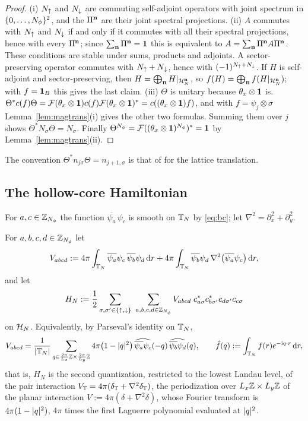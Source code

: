 \begin{proof}
(i) $N_{\uparrow}$ and $N_{\downarrow}$ are commuting self-adjoint operators with joint spectrum in $\{0,\dots,N_{\phi}\}^2$, and the
$\Pi^{\mathbf{n}}$ are their joint spectral projections. (ii) $A$ commutes with $N_{\uparrow}$ and $N_{\downarrow}$ if and only if it
commutes with all their spectral projections, hence with every $\Pi^{\mathbf{n}}$; since $\sum_{\mathbf{n}}\Pi^{\mathbf{n}}=\mathbf{1}$ this is
equivalent to $A=\sum_{\mathbf{n}}\Pi^{\mathbf{n}} A\Pi^{\mathbf{n}}$. These conditions are stable under sums, products and adjoints.
A sector-preserving operator commutes with $N_{\uparrow}+N_{\downarrow}$, hence with $(-1)^{N_{\uparrow}+N_{\downarrow}}$. If $H$ is self-adjoint and
sector-preserving, then $H=\bigoplus_{\mathbf{n}} H|_{\mathcal{H}_N^{\mathbf{n}}}$, so $f(H)=\bigoplus_{\mathbf{n}} f(H|_{\mathcal{H}_N^{\mathbf{n}}})$; with
$f=\mathbf{1}_B$ this gives the last claim. (iii) $\Theta$ is unitary because $\theta_x\otimes\mathbf{1}$ is.
$\Theta^*c(f)\Theta=\mathcal{F}(\theta_x\otimes\mathbf{1})c(f)\mathcal{F}(\theta_x\otimes\mathbf{1})^*=c((\theta_x\otimes\mathbf{1})f)$, and with
$f=\psi_j\otimes\sigma$ Lemma~\ref{lem:magtrans}(i) gives the other two formulas. Summing them over $j$ shows
$\Theta^*N_\sigma\Theta=N_\sigma$. Finally $\Theta^{N_{\phi}}=\mathcal{F}((\theta_x\otimes\mathbf{1})^{N_{\phi}})^*=\mathbf{1}$ by
Lemma~\ref{lem:magtrans}(ii).
\end{proof}

The convention $\Theta^*n_{j\sigma}\Theta=n_{j+1,\sigma}$ is that of \cite[Section~5.2]{BBDF21} for the lattice
translation.

\subsection{The hollow-core Hamiltonian}

For $a,c\in\mathbb{Z}_{N_{\phi}}$ the function $\overline{\psi_a}\,\psi_c$ is smooth on $\mathbb{T}_N$ by \eqref{eq:bc}; let
$\nabla^2=\partial_x^2+\partial_y^2$.

\begin{definition}\label{def:hamiltonian}
For $a,b,c,d\in\mathbb{Z}_{N_{\phi}}$ let
\begin{equation}\label{eq:Vabcd}
V_{abcd}:=4\pi\int_{\mathbb{T}_N}\overline{\psi_a}\psi_c\,\overline{\psi_b}\psi_d\,\mathrm{d} r+4\pi\int_{\mathbb{T}_N}\overline{\psi_b}\psi_d\,\nabla^2\bigl(\overline{\psi_a}\psi_c\bigr)\,\mathrm{d} r,
\end{equation}
and let
\begin{equation}\label{eq:HN}
H_N:=\frac12\sum_{\sigma,\sigma'\in\{\up,\dn\}}\ \sum_{a,b,c,d\in\Z_{\Nphi}}V_{abcd}\;
c_{a\sigma}^*c_{b\sigma'}^*c_{d\sigma'}c_{c\sigma}
\end{equation}
on $\mathcal{H}_N$. Equivalently, by Parseval's identity on $\mathbb{T}_N$,
\[
V_{abcd}=\frac1{\lvert\mathbb{T}_N\rvert}\sum_{q\in\frac{2\pi}{L_x}\mathbb{Z}\times\frac{2\pi}{L_y}\mathbb{Z}}4\pi\bigl(1-\lvert q\rvert^2\bigr)\,
\widehat{\overline{\psi_a}\psi_c}(-q)\,\widehat{\overline{\psi_b}\psi_d}(q),\qquad\hat f(q):=\int_{\mathbb{T}_N}f(r)e^{-\mathrm{i} q\cdot r}\,\mathrm{d} r ,
\]
that is, $H_N$ is the second quantization, restricted to the lowest Landau level, of the pair interaction
$V_{\mathbb{T}}=4\pi(\delta_{\mathbb{T}}+\nabla^2\delta_{\mathbb{T}})$, the periodization over $L_x\mathbb{Z}\times L_y\mathbb{Z}$ of the planar
interaction $V:=4\pi(\delta+\nabla^2\delta)$, whose Fourier transform is $4\pi(1-\lvert q\rvert^2)$, $4\pi$ times the first
Laguerre polynomial evaluated at $\lvert q\rvert^2$.
\end{definition}

